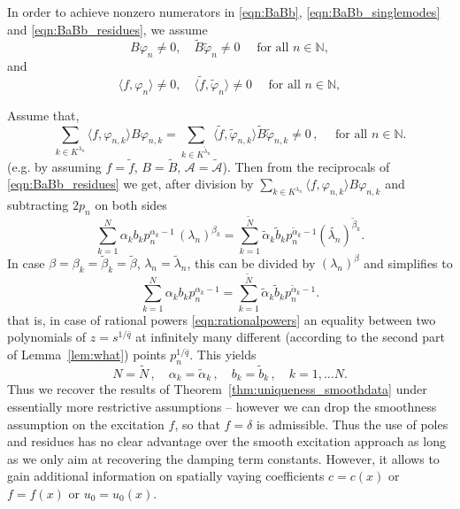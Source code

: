 In order to achieve nonzero numerators in \eqref{eqn:BaBb}, \eqref{eqn:BaBb_singlemodes} and \eqref{eqn:BaBb_residues}, we assume
\begin{equation}\label{eqn:Bnonzero}
B\varphi_{n}\not=0, \quad \tilde{B}\tilde{\varphi}_{n} \not=0\quad\mbox{ for all }n\in\mathbb{N},
\end{equation}
and
\begin{equation}\label{eqn:fmodesnonzero}
\langle f,\varphi_n\rangle\not=0, \quad \langle \tilde{f},\tilde{\varphi}_n\rangle\not=0\quad \mbox{ for all }n\in\mathbb{N},
\end{equation} 

Assume that, 
\begin{equation}\label{eqn:fBequal}
\sum_{k\in K^{\lambda_n}}\langle f,\varphi_{n,k}\rangle B\varphi_{n,k}
=\sum_{k\in K^{\tilde{\lambda}_n}} \langle {\tilde f},{\tilde \varphi}_{n,k}\rangle {\tilde B} {\tilde \varphi}_{n,k}\not=0\,, \quad 
\mbox{ for all }n\in\mathbb{N}.
\end{equation}
(e.g. by assuming $f=\tilde{f}$, $B=\tilde{B}$, $\mathcal{A}=\tilde{\mathcal{A}}$). 
Then from the reciprocals of \eqref{eqn:BaBb_residues} we get, after division by 
$\sum_{k\in K^{\lambda_n}}\langle f,\varphi_{n,k}\rangle B\varphi_{n,k}$ and subtracting $2p_n$ on both sides
\begin{equation}\label{eqn:BaBb_residues_recip}
\sum_{k=1}^N \alpha_k b_k p_n^{\alpha_k-1}\, (\lambda_{n})^{\beta_k}
=\sum_{k=1}^{\tilde N} {\tilde \alpha}_k \tilde{b}_k p_n^{{\tilde \alpha}_k-1}(\tilde{\lambda_{n}})^{\tilde{\beta}_k}.
\end{equation}
In case $\beta=\beta_k=\tilde{\beta}_k=\tilde{\beta}$, $\lambda_n=\tilde{\lambda}_n$, this can be divided by $(\lambda_{n})^{\beta}$ and simplifies to 
\[
\sum_{k=1}^N \alpha_k b_k p_n^{\alpha_k-1}
=\sum_{k=1}^{\tilde N} {\tilde \alpha}_k \tilde{b}_k p_n^{{\tilde \alpha}_k-1}.
\]
that is, in case of rational powers \eqref{eqn:rationalpowers}
an equality between two polynomials of $z=s^{1/\bar{q}}$ at infinitely many different (according to the second part of Lemma~\ref{lem:what}) points $p_n^{1/\bar{q}}$. 
This yields
\[
N=\tilde{N}\,,\quad \alpha_k=\tilde{\alpha}_k\,, \quad b_k=\tilde{b}_k\,,\quad  k=1,\ldots N.
\]
Thus we recover the results of Theorem~\ref{thm:uniqueness_smoothdata} under essentially more restrictive assumptions 
-- however we can drop the smoothness assumption on the excitation $f$, so that $f=\delta$ is admissible.
Thus the use of poles and residues has no clear advantage over the smooth excitation approach as long as we only aim at recovering the damping term constants. However, it allows to gain additional information on spatially vaying coefficients $c=c(x)$ or $f=f(x)$ or $u_0=u_0(x)$.

